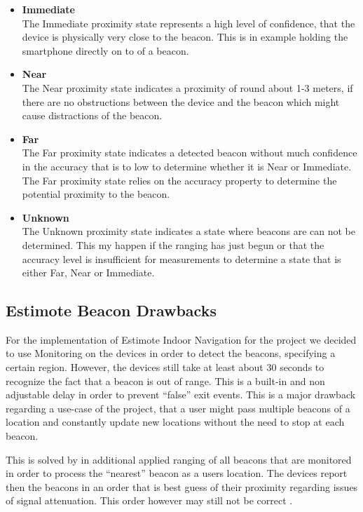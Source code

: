 \begin{itemize}

    \item \textbf{Immediate}\\
    The Immediate proximity state represents a high level of confidence, that the device is physically very close to the beacon. This is in example holding the smartphone directly on to of a beacon.
    \item \textbf{Near}\\
    The Near proximity state indicates a proximity of round about 1-3 meters, if there are no obstructions between the device and the beacon which might cause distractions of the beacon.
    \item \textbf{Far}\\
    The Far proximity state indicates a detected beacon without much confidence in the accuracy that is to low to determine whether it is Near or Immediate. The Far proximity state relies on the accuracy property to determine the potential proximity to the beacon.
    \item \textbf{Unknown}\\
    The Unknown proximity state indicates a state where beacons are can not be determined. This my happen if the ranging has just begun or that the accuracy level is insufficient for measurements to determine a state that is either Far, Near or Immediate.
\end{itemize}

\subsection{Estimote Beacon Drawbacks}

For the implementation of Estimote Indoor Navigation for the project we decided to use Monitoring on the devices in order to detect the beacons, specifying a certain region. However, the devices still take at least about 30 seconds to recognize the fact that a beacon is out of range. This is a  built-in and non adjustable delay in order to prevent \enquote{false} exit events.\cite{Estimote} This is a major drawback regarding a use-case of the project, that a user might pass multiple beacons of a location and constantly update new locations without the need to stop at each beacon.

This is solved by in additional applied ranging of all beacons that are monitored in order to process the \enquote{nearest} beacon as a users location. The devices report then the beacons in an order that is best guess of their proximity regarding issues of signal attenuation. This order however may still not be correct \cite{iBeacon}.



